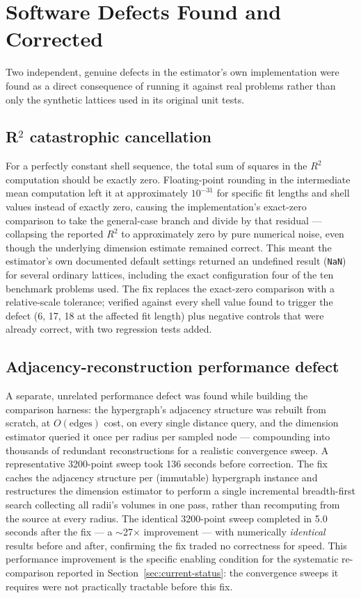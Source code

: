 \documentclass[11pt,a4paper]{article}
\begin{document}
\section{Software Defects Found and Corrected}
\label{sec:defects}

Two independent, genuine defects in the estimator's own implementation
were found as a direct consequence of running it against real problems
rather than only the synthetic lattices used in its original unit tests.

\subsection{R\texorpdfstring{$^2$}{²} catastrophic cancellation}

For a perfectly constant shell sequence, the total sum of squares in the
$R^2$ computation should be exactly zero. Floating-point rounding in the
intermediate mean computation left it at approximately $10^{-31}$ for
specific fit lengths and shell values instead of exactly zero, causing the
implementation's exact-zero comparison to take the general-case branch and
divide by that residual --- collapsing the reported $R^2$ to approximately
zero by pure numerical noise, even though the underlying dimension
estimate remained correct. This meant the estimator's own documented
default settings returned an undefined result (\texttt{NaN}) for several
ordinary lattices, including the exact configuration four of the ten
benchmark problems used. The fix replaces the exact-zero comparison with a
relative-scale tolerance; verified against every shell value found to
trigger the defect (6, 17, 18 at the affected fit length) plus negative
controls that were already correct, with two regression tests added.

\subsection{Adjacency-reconstruction performance defect}

A separate, unrelated performance defect was found while building the
comparison harness: the hypergraph's adjacency structure was rebuilt from
scratch, at $O(\text{edges})$ cost, on every single distance query, and
the dimension estimator queried it once per radius per sampled node ---
compounding into thousands of redundant reconstructions for a realistic
convergence sweep. A representative 3200-point sweep took 136 seconds
before correction. The fix caches the adjacency structure per (immutable)
hypergraph instance and restructures the dimension estimator to perform a
single incremental breadth-first search collecting all radii's volumes in
one pass, rather than recomputing from the source at every radius. The
identical 3200-point sweep completed in 5.0 seconds after the fix --- a
$\sim$27$\times$ improvement --- with numerically \emph{identical} results
before and after, confirming the fix traded no correctness for speed. This
performance improvement is the specific enabling condition for the
systematic re-comparison reported in
Section~\ref{sec:current-status}: the convergence sweeps it requires were
not practically tractable before this fix.
\end{document}
